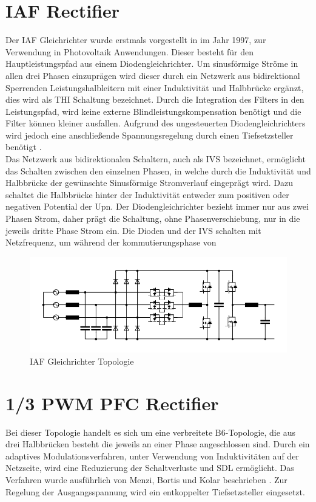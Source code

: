 \section{IAF Rectifier }
Der \gls{IAF} Gleichrichter wurde erstmals vorgestellt in \cite{IAFfirst} im Jahr 1997, zur Verwendung in Photovoltaik Anwendungen. Dieser besteht für den Hauptleistungspfad aus einem Diodengleichrichter. Um sinusförmige Ströme in allen drei Phasen einzuprägen wird dieser durch ein Netzwerk aus bidirektional Sperrenden Leistungshalbleitern mit einer Induktivität und Halbbrücke ergänzt, dies wird als \gls{THI} Schaltung bezeichnet. Durch die Integration des Filters in den Leistungspfad, wird keine externe Blindleistungskompensation benötigt und die Filter können kleiner ausfallen. Aufgrund des ungesteuerten Diodengleichrichters wird jedoch eine anschließende Spannungsregelung durch einen Tiefsetzsteller benötigt \cite{ThesisSchrittwieserBuckTypePFC_2017}.\\
Das Netzwerk aus bidirektionalen Schaltern, auch als \gls{IVS} bezeichnet, ermöglicht das Schalten zwischen den einzelnen Phasen, in welche durch die Induktivität und Halbbrücke der gewünschte Sinusförmige Stromverlauf eingeprägt wird. Dazu schaltet die Halbbrücke hinter der Induktivität entweder zum positiven oder negativen Potential der \gls{Upn}. Der Diodengleichrichter bezieht immer nur aus zwei Phasen Strom, daher prägt die Schaltung, ohne Phasenverschiebung, nur in die jeweils dritte Phase Strom ein. Die Dioden und der \gls{IVS} schalten mit Netzfrequenz, um während der kommutierungsphase von 
\begin{figure}
	\centering
	\includegraphics[width=0.9\linewidth]{content/Grafiken/IAF}
	\caption[\gls{IAF} Gleichrichter Topologie]{\gls{IAF} Gleichrichter Topologie}
	\label{fig:iaf}
\end{figure}


\section{1/3 PWM PFC Rectifier}
\label{sec:GrundlagenB6}
Bei dieser Topologie handelt es sich um eine verbreitete B6-Topologie, die aus drei Halbbrücken besteht die jeweils an einer Phase angeschlossen sind. Durch ein adaptives Modulationsverfahren, unter Verwendung von Induktivitäten auf der Netzseite, wird eine Reduzierung der Schaltverluste und \gls{SDL} ermöglicht. Das Verfahren wurde ausführlich von Menzi, Bortis und Kolar beschrieben \cite{13PWMPFC}. Zur Regelung der Ausgangsspannung wird ein entkoppelter Tiefsetzsteller eingesetzt.\\



